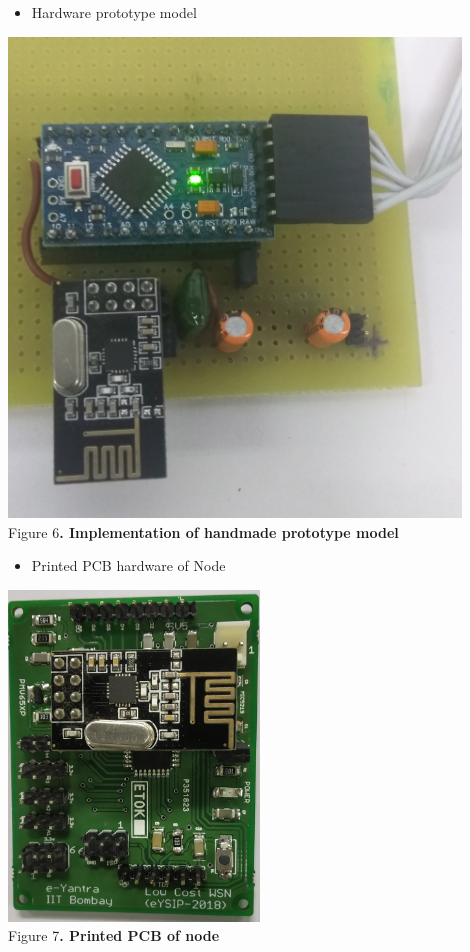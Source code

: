 \documentclass[a4paper,12pt,oneside]{book}
\begin{document}
\begin{itemize}
\item Hardware prototype model
\end{itemize}
\begin{center}
\includegraphics[width=0.9\textwidth]{hardware_prototype.PNG}\\
         \small{Figure 6\textbf{. Implementation of handmade prototype model}}\\
\end{center}
\clearpage
\begin{itemize}
\item Printed PCB hardware of Node
\end{itemize}

\begin{center}
\includegraphics[width=0.5\textwidth]{node_Printed_board.PNG}\\
         \small{Figure 7\textbf{. Printed PCB of node}}\\
\end{center}
\end{document}
